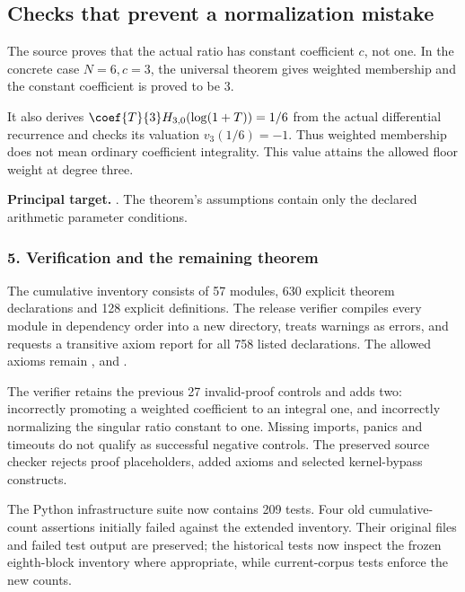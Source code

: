 \subsection*{Checks that prevent a normalization mistake}
The source proves that the actual ratio has constant coefficient $c$, not one. In the concrete case $N=6,c=3$, the universal theorem gives weighted membership and the constant coefficient is proved to be $3$.

It also derives $\coef{T}{3}H_{3,0}(\log(1+T))=1/6$ from the actual differential recurrence and checks its valuation $v_3(1/6)=-1$. Thus weighted membership does not mean ordinary coefficient integrality. This value attains the allowed floor weight at degree three.

\textbf{Principal target.} . The theorem's assumptions contain only the declared arithmetic parameter conditions.
\par\medskip
\subsubsection*{5. Verification and the remaining theorem}
The cumulative inventory consists of 57 modules, 630 explicit theorem declarations and 128 explicit definitions. The release verifier compiles every module in dependency order into a new directory, treats warnings as errors, and requests a transitive axiom report for all 758 listed declarations. The allowed axioms remain ,  and .

The verifier retains the previous 27 invalid-proof controls and adds two: incorrectly promoting a weighted coefficient to an integral one, and incorrectly normalizing the singular ratio constant to one. Missing imports, panics and timeouts do not qualify as successful negative controls. The preserved source checker rejects proof placeholders, added axioms and selected kernel-bypass constructs.

The Python infrastructure suite now contains 209 tests. Four old cumulative-count assertions initially failed against the extended inventory. Their original files and failed test output are preserved; the historical tests now inspect the frozen eighth-block inventory where appropriate, while current-corpus tests enforce the new counts.

